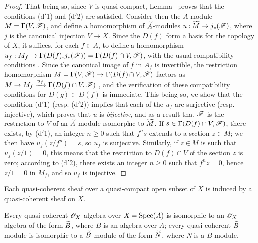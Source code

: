 \begin{proof}
That being so, since $V$ is quasi-compact, Lemma~ proves that
the conditions (d$'$1) and (d$'$2) are satisfied.
Consider then the $A$-module $M=\Gamma(V,\mathscr{F})$, and define a homomorphism of ${\widetilde{A}}$-modules $u:\wt{M}\to j_*(\sh{F})$, where $j$ is the canonical injection $V\to X$.
Since the $D(f)$ form a basis for the topology of $X$, it suffices, for each $f\in A$, to define a homomorphism $u_f:M_f\to\Gamma(D(f),j_*(\sh{F}))=\Gamma(D(f)\cap V,\sh{F})$, with the usual compatibility conditions .
Since the canonical image of $f$ in $A_f$ is invertible, the restriction homomorphism $M=\Gamma(V,\sh{F})\to\Gamma(D(f)\cap V,\sh{F})$ factors as $M\to M_f\xrightarrow{u_f}\Gamma(D(f)\cap V,\sh{F})$ , and the verification of these compatibility conditions for $D(g)\subset D(f)$ is immediate.
This being so, we show that the condition (d$'$1) (resp. (d$'$2)) implies that each of the $u_f$ are surjective (resp. injective), which proves that $u$ is \emph{bijective}, and as a result that $\mathscr{F}$ is the restriction to $V$ of an ${\widetilde{A}}$-module isomorphic to ${\widetilde{M}}$.
If $s\in\Gamma(D(f)\cap V,\mathscr{F})$, there exists, by (d$'$1), an integer $n\geqslant 0$ such that $f^n s$ extends to a section $z\in M$;
we then have $u_f(z/f^n)=s$, so $u_f$ is surjective.
Similarly, if $z\in M$ is such that $u_f(z/1)=0$, this means that the restriction to $D(f)\cap V$ of the section $z$ is zero;
according to (d$'$2), there exists an integer $n\geqslant 0$ such that $f^n z=0$, hence $z/1=0$ in $M_f$, and so $u_f$ is injective.
\end{proof}

\begin{cor}[1.4.2]
\label{1.1.4.2}
Each quasi-coherent sheaf over a quasi-compact open subset of $X$ is induced by a quasi-coherent sheaf on $X$.
\end{cor}

\begin{cor}[1.4.3]
\label{1.1.4.3}
Every quasi-coherent $\mathscr{O}_X$-algebra over $X={\mathop{\mathrm{Spec}}\nolimits}(A)$ is isomorphic to an $\mathscr{O}_X$-algebra of the form ${\widetilde{B}}$, where $B$ is an algebra over $A$;
every quasi-coherent ${\widetilde{B}}$-module is isomorphic to a ${\widetilde{B}}$-module of the form ${\widetilde{N}}$, where $N$ is a $B$-module.
\end{cor}

